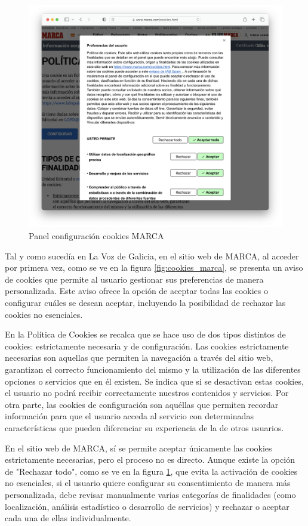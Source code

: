 \begin{figure}[H]
    \centering
    \includegraphics[width=\textwidth]{panel_cookies_marca.png}
    \caption{Panel configuración cookies MARCA}
    \label{fig:panel_cookies_marca}
\end{figure}

Tal y como sucedía en La Voz de Galicia, en el sitio web de MARCA, al acceder por primera vez, como se ve en la figura \ref{fig:cookies_marca}, se presenta un aviso de cookies que permite al usuario gestionar sus preferencias de manera personalizada. Este aviso ofrece la opción de aceptar todas las cookies o configurar cuáles se desean aceptar, incluyendo la posibilidad de rechazar las cookies no esenciales.

En la Política de Cookies se recalca que se hace uso de dos tipos distintos de cookies: estrictamente necesaria y de configuración. Las cookies estrictamente necesarias son aquellas que permiten la navegación a través del sitio web, garantizan el correcto funcionamiento del mismo y la utilización de las diferentes opciones o servicios que en él existen. Se indica que si se desactivan estas cookies, el usuario no podrá recibir correctamente nuestros contenidos y servicios. Por otra parte, las cookies de configuración son aquéllas que permiten recordar información para que el usuario acceda al servicio con determinadas características que pueden diferenciar su experiencia de la de otros usuarios.

En el sitio web de MARCA, sí se permite aceptar únicamente las cookies estrictamente necesarias, pero el proceso no es directo. Aunque existe la opción de "Rechazar todo", como se ve en la figura \ref{fig:panel_cookies_marca}, que evita la activación de cookies no esenciales, si el usuario quiere configurar su consentimiento de manera más personalizada, debe revisar manualmente varias categorías de finalidades (como localización, análisis estadístico o desarrollo de servicios) y rechazar o aceptar cada una de ellas individualmente.

